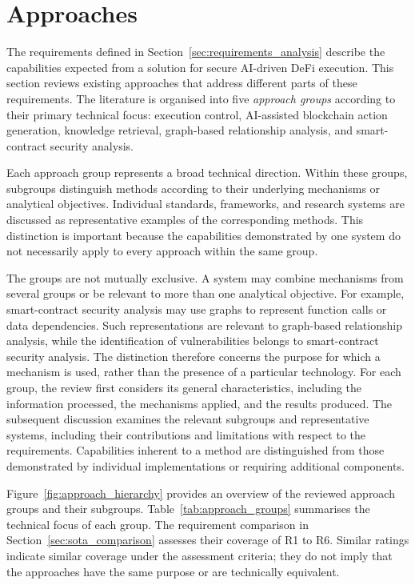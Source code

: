 
\section{Approaches}
\label{sec:sota_approaches}



The requirements defined in Section~\ref{sec:requirements_analysis}
describe the capabilities expected from a solution for secure
AI-driven DeFi execution. This section reviews existing approaches
that address different parts of these requirements. The literature
is organised into five \textit{approach groups} according to their
primary technical focus: execution control, AI-assisted blockchain
action generation, knowledge retrieval, graph-based relationship
analysis, and smart-contract security analysis.

Each approach group represents a broad technical direction. Within
these groups, subgroups distinguish methods according to their
underlying mechanisms or analytical objectives. Individual
standards, frameworks, and research systems are discussed as
representative examples of the corresponding methods. This
distinction is important because the capabilities demonstrated by
one system do not necessarily apply to every approach within
the same group.

The groups are not mutually exclusive. A system may combine
mechanisms from several groups or be relevant to more than
one analytical objective. For example, smart-contract security
analysis may use graphs to represent function calls or data
dependencies. Such representations are relevant to graph-based
relationship analysis, while the identification of vulnerabilities
belongs to smart-contract security analysis. The distinction
therefore concerns the purpose for which a mechanism is used,
rather than the presence of a particular technology. For each group, the review first considers its general
characteristics, including the information processed, the
mechanisms applied, and the results produced. The subsequent
discussion examines the relevant subgroups and representative
systems, including their contributions and limitations with
respect to the requirements. Capabilities inherent to a method
are distinguished from those demonstrated by individual
implementations or requiring additional components.

Figure~\ref{fig:approach_hierarchy} provides an overview of
the reviewed approach groups and their subgroups.
Table~\ref{tab:approach_groups} summarises the technical focus
of each group. The requirement
comparison in Section~\ref{sec:sota_comparison} assesses their
coverage of R1 to R6. Similar ratings indicate similar coverage
under the assessment criteria; they do not imply that the
approaches have the same purpose or are technically equivalent.



